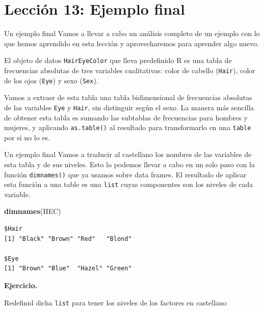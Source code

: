 \documentclass[
  ignorenonframetext,
  aspectratio=169]{beamer}
\newenvironment{Shaded}{\begin{snugshade}}{\end{snugshade}}
\newcommand{\FunctionTok}[1]{\textcolor[rgb]{0.13,0.29,0.53}{\textbf{#1}}}
\newcommand{\NormalTok}[1]{#1}
\begin{document}
\section{Lección 13: Ejemplo final}\label{lecciuxf3n-13-ejemplo-final}

\begin{frame}[fragile]{Un ejemplo final}
\label{un-ejemplo-final}
Vamos a llevar a cabo un análisis completo de un ejemplo con lo que
hemos aprendido en esta lección y aprovecharemos para aprender algo
nuevo.

El objeto de datos \texttt{HairEyeColor} que lleva predefinido R es una
tabla de frecuencias absolutas de tres variables cualitativas: color de
cabello (\texttt{Hair}), color de los ojos (\texttt{Eye}) y sexo
(\texttt{Sex}).

Vamos a extraer de esta tabla una tabla bidimensional de frecuencias
absolutas de las variables \texttt{Eye} y \texttt{Hair}, sin distinguir
según el sexo. La manera más sencilla de obtener esta tabla es sumando
las subtablas de frecuencias para hombres y mujeres, y aplicando
\texttt{as.table()} al resultado para transformarlo en una
\texttt{table} por si no lo es.
\end{frame}

\begin{frame}[fragile]{Un ejemplo final}
\label{un-ejemplo-final-1}
Vamos a traducir al castellano los nombres de las variables de esta
tabla y de sus niveles. Esto lo podemos llevar a cabo en un solo paso
con la función \texttt{dimnames()} que ya usamos sobre data frames. El
resultado de aplicar esta función a una table es una \texttt{list} cuyas
componentes son los niveles de cada variable.

\begin{Shaded}
\begin{Highlighting}[]
\FunctionTok{dimnames}\NormalTok{(HEC)}
\end{Highlighting}
\end{Shaded}

\begin{verbatim}
$Hair
[1] "Black" "Brown" "Red"   "Blond"

$Eye
[1] "Brown" "Blue"  "Hazel" "Green"
\end{verbatim}

\textbf{Ejercicio.}

Redefinid dicha \texttt{list} para tener los niveles de los factores en
castellano
\end{frame}
\end{document}
